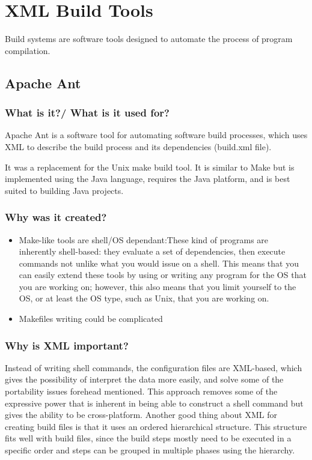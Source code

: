 \section{XML Build Tools}
Build systems are software tools designed to automate the process of program compilation.

\subsection{Apache Ant}
\subsubsection{What is it?/ What is it used for?}

Apache Ant is a software tool for automating software build processes, which uses XML to describe the build process and its dependencies (build.xml file).

It was a replacement for the Unix make build tool. It is similar to Make but is implemented using the Java language, requires the Java platform, and is best suited to building Java projects.

\subsubsection{Why was it created?}



\begin{itemize}

\item Make-like tools are shell/OS dependant:These kind of programs are inherently shell-based: they evaluate a set of dependencies, then execute commands not unlike what you would issue on a shell. This means that you can easily extend these tools by using or writing any program for the OS that you are working on; however, this also means that you limit yourself to the OS, or at least the OS type, such as Unix, that you are working on.

\item Makefiles writing could be complicated

\end{itemize}


\subsubsection{Why is XML important?}

Instead of writing shell commands, the configuration files are XML-based, which gives the possibility of interpret the data more easily, and solve some of the portability issues forehead mentioned. This approach removes some of the expressive power that is inherent in being able to construct a shell command but gives the ability to be cross-platform. Another good thing about XML for creating build files is that it uses an ordered hierarchical structure. This structure fits well with build files, since the build steps mostly need to be executed in a specific order and steps can be grouped in multiple phases using the hierarchy.



